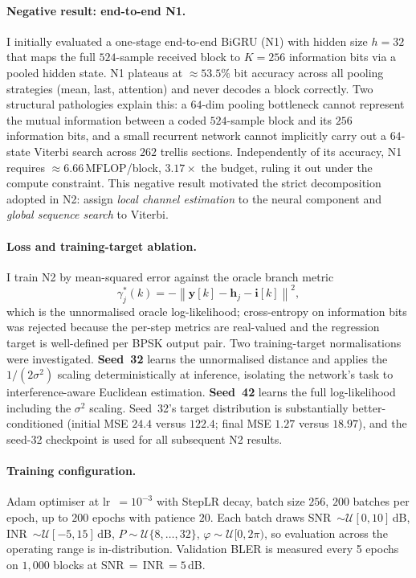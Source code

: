 \documentclass[conference]{IEEEtran}
\newcommand{\norm}[1]{\left\lVert#1\right\rVert}
\begin{document}
\paragraph*{Negative result: end-to-end N1.}
I initially evaluated a one-stage end-to-end BiGRU (N1) with hidden size
$h=32$ that maps the full $524$-sample received block to $K=256$
information bits via a pooled hidden state.  N1 plateaus at $\approx
53.5\%$ bit accuracy across all pooling strategies (mean, last, attention)
and never decodes a block correctly.  Two structural pathologies explain
this: a $64$-dim pooling bottleneck cannot represent the mutual
information between a coded $524$-sample block and its $256$ information
bits, and a small recurrent network cannot implicitly carry out a
$64$-state Viterbi search across $262$ trellis sections.  Independently of
its accuracy, N1 requires $\approx 6.66$\,MFLOP/block, $3.17\times$ the
budget, ruling it out under the compute constraint.  This negative
result motivated the strict decomposition adopted in N2: assign
\emph{local channel estimation} to the neural component and
\emph{global sequence search} to Viterbi.

\paragraph*{Loss and training-target ablation.}
I train N2 by mean-squared error against the oracle branch metric
\begin{equation}
  \gamma^*_j(k) = -\norm{\mathbf{y}[k]-\mathbf{h}_j-\mathbf{i}[k]}^2,
  \label{eq:oracle_metric}
\end{equation}
which is the unnormalised oracle log-likelihood; cross-entropy on
information bits was rejected because the per-step metrics are real-valued
and the regression target is well-defined per BPSK output pair.
Two training-target normalisations were investigated.
\textbf{Seed~32} learns the unnormalised distance and applies the
$1/(2\sigma^2)$ scaling deterministically at inference, isolating the
network's task to interference-aware Euclidean estimation.
\textbf{Seed~42} learns the full log-likelihood including the
$\sigma^2$ scaling.  Seed~32's target distribution is substantially
better-conditioned (initial MSE $24.4$ versus $122.4$; final MSE $1.27$
versus $18.97$), and the seed-32 checkpoint is used for all subsequent
N2 results.

\paragraph*{Training configuration.}
Adam optimiser at lr~$=10^{-3}$ with StepLR decay, batch size $256$,
$200$ batches per epoch, up to $200$ epochs with patience $20$.  Each
batch draws SNR~$\sim\mathcal{U}[0,10]$\,dB,
INR~$\sim\mathcal{U}[-5,15]$\,dB, $P\sim\mathcal{U}\{8,\ldots,32\}$,
$\varphi\sim\mathcal{U}[0,2\pi)$, so evaluation across the operating
range is in-distribution.  Validation BLER is measured every 5 epochs on
$1{,}000$ blocks at SNR\,$=$\,INR\,$=5$\,dB.
\end{document}
